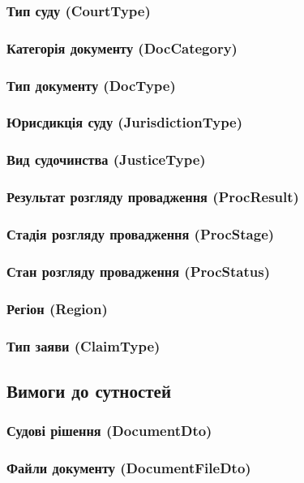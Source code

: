 \documentclass{article}
\begin{document}
\subsubsection{Тип суду (CourtType)}
\subsubsection{Категорія документу (DocCategory)}
\subsubsection{Тип документу (DocType)}
\subsubsection{Юрисдикція суду (JurisdictionType)}
\subsubsection{Вид судочинства (JusticeType)}
\subsubsection{Результат розгляду провадження (ProcResult)}
\subsubsection{Стадія розгляду провадження (ProcStage)}
\subsubsection{Стан розгляду провадження (ProcStatus)}
\subsubsection{Регіон (Region)}
\subsubsection{Тип заяви (ClaimType)}

\newpage
\subsection{Вимоги до сутностей}

\subsubsection{Судові рішення (DocumentDto)}
\subsubsection{Файли документу (DocumentFileDto)}
\end{document}
